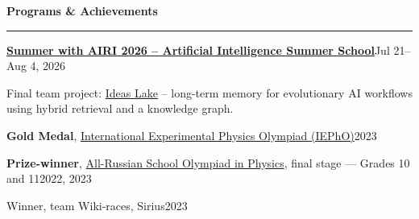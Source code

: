 \documentclass[10pt,a4paper]{article}
\newcommand{\sectiontitle}[1]{%
  \vspace{0.42em}%
  {\normalsize\bfseries\color{accent} #1}\par
  \vspace{0.10em}\hrule\vspace{0.24em}%
}
\newcommand{\entry}[4]{%
  \textbf{#1}\hfill {\color{textgray}#2}\par
  {\color{textgray}#3}\par
  #4\vspace{0.25em}%
}
\newcommand{\achievement}[2]{%
  #1\hfill{\color{textgray}#2}\par
}
\begin{document}
\sectiontitle{Programs \& Achievements}
\entry{\href{https://airi.net/ru/summer-school-2026/}{Summer with AIRI 2026 -- Artificial Intelligence Summer School}}{Jul 21--Aug 4, 2026}{Final team project: \href{https://github.com/n4rly-boop/ideas-lake}{Ideas Lake} -- long-term memory for evolutionary AI workflows using hybrid retrieval and a knowledge graph.}{}
\achievement{\textbf{Gold Medal}, \href{https://iepho.ru/}{International Experimental Physics Olympiad (IEPhO)}}{2023}
\achievement{\textbf{Prize-winner}, \href{https://vos.olimpiada.ru/}{All-Russian School Olympiad in Physics}, final stage — Grades 10 and 11}{2022, 2023}
\achievement{Winner, team Wiki-races, Sirius}{2023}
\end{document}
